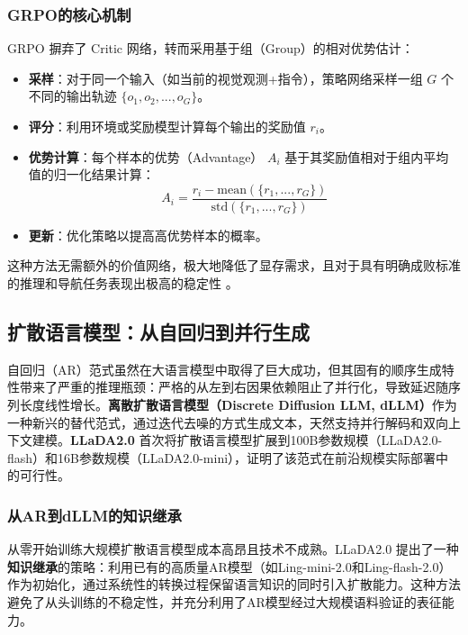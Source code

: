 \subsubsection{GRPO的核心机制}
GRPO 摒弃了 Critic 网络，转而采用基于组（Group）的相对优势估计：
\begin{itemize}
    \item \textbf{采样}：对于同一个输入（如当前的视觉观测+指令），策略网络采样一组 $G$ 个不同的输出轨迹 $\{o_1, o_2,..., o_G\}$。
    \item \textbf{评分}：利用环境或奖励模型计算每个输出的奖励值 $r_i$。
    \item \textbf{优势计算}：每个样本的优势（Advantage） $A_i$ 基于其奖励值相对于组内平均值的归一化结果计算：
    \begin{equation}
        A_i = \frac{r_i - \text{mean}(\{r_1,..., r_G\})}{\text{std}(\{r_1,..., r_G\})}
    \end{equation}
    \item \textbf{更新}：优化策略以提高高优势样本的概率。
\end{itemize}
这种方法无需额外的价值网络，极大地降低了显存需求，且对于具有明确成败标准的推理和导航任务表现出极高的稳定性 \cite{deepseek_r1}。

\subsection{扩散语言模型：从自回归到并行生成}
自回归（AR）范式虽然在大语言模型中取得了巨大成功，但其固有的顺序生成特性带来了严重的推理瓶颈：严格的从左到右因果依赖阻止了并行化，导致延迟随序列长度线性增长。\textbf{离散扩散语言模型（Discrete Diffusion LLM, dLLM）}作为一种新兴的替代范式，通过迭代去噪的方式生成文本，天然支持并行解码和双向上下文建模。\textbf{LLaDA2.0} \cite{llada2} 首次将扩散语言模型扩展到100B参数规模（LLaDA2.0-flash）和16B参数规模（LLaDA2.0-mini），证明了该范式在前沿规模实际部署中的可行性。

\subsubsection{从AR到dLLM的知识继承}
从零开始训练大规模扩散语言模型成本高昂且技术不成熟。LLaDA2.0 提出了一种\textbf{知识继承}的策略：利用已有的高质量AR模型（如Ling-mini-2.0和Ling-flash-2.0）作为初始化，通过系统性的转换过程保留语言知识的同时引入扩散能力。这种方法避免了从头训练的不稳定性，并充分利用了AR模型经过大规模语料验证的表征能力。

